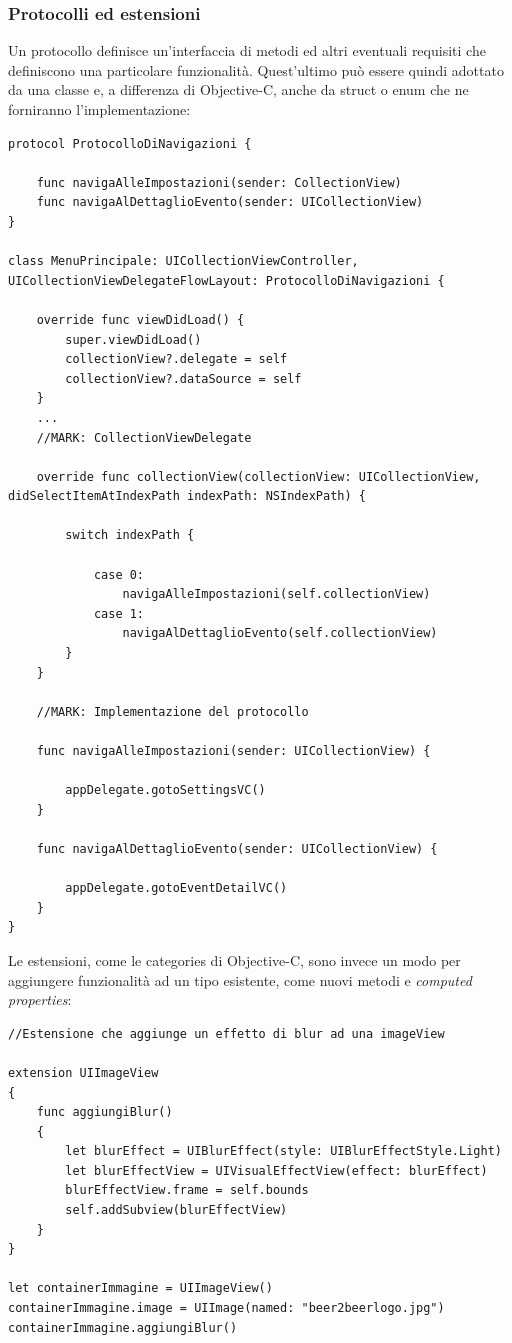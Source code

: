 \subsubsection{Protocolli ed estensioni}
Un protocollo definisce un'interfaccia di metodi ed altri eventuali requisiti che definiscono una particolare funzionalità. Quest'ultimo può essere quindi adottato da una classe e, a differenza di Objective-C, anche da struct o enum che ne forniranno l'implementazione:
\lstset{language=[Objective]C, breakindent=40pt, breaklines}
\begin{lstlisting}
protocol ProtocolloDiNavigazioni {
	
	func navigaAlleImpostazioni(sender: CollectionView) 
	func navigaAlDettaglioEvento(sender: UICollectionView)
}

class MenuPrincipale: UICollectionViewController, UICollectionViewDelegateFlowLayout: ProtocolloDiNavigazioni {

	override func viewDidLoad() {
        super.viewDidLoad()
		collectionView?.delegate = self
		collectionView?.dataSource = self
	}
	...
	//MARK: CollectionViewDelegate 
	
	override func collectionView(collectionView: UICollectionView, didSelectItemAtIndexPath indexPath: NSIndexPath) {
		
		switch indexPath {
			
			case 0: 
				navigaAlleImpostazioni(self.collectionView)
			case 1:
				navigaAlDettaglioEvento(self.collectionView)
		}
	}	
		
	//MARK: Implementazione del protocollo 
		
	func navigaAlleImpostazioni(sender: UICollectionView) {
        
        appDelegate.gotoSettingsVC()
    }
    
    func navigaAlDettaglioEvento(sender: UICollectionView) {
        
        appDelegate.gotoEventDetailVC()
    }
}
\end{lstlisting}
Le estensioni, come le categories di Objective-C, sono invece un modo per aggiungere funzionalità ad un tipo esistente, come nuovi metodi e \textit{computed properties}:
\lstset{language=[Objective]C, breakindent=40pt, breaklines}
\begin{lstlisting}
//Estensione che aggiunge un effetto di blur ad una imageView

extension UIImageView
{
    func aggiungiBlur()
    {
        let blurEffect = UIBlurEffect(style: UIBlurEffectStyle.Light)
        let blurEffectView = UIVisualEffectView(effect: blurEffect)
        blurEffectView.frame = self.bounds
        self.addSubview(blurEffectView)
    }
}

let containerImmagine = UIImageView()
containerImmagine.image = UIImage(named: "beer2beerlogo.jpg")
containerImmagine.aggiungiBlur()
\end{lstlisting}
